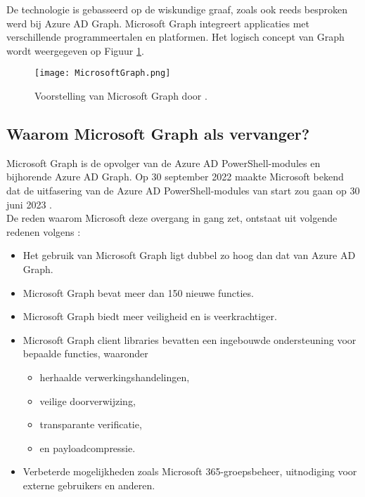 De technologie is gebasseerd op de wiskundige graaf, zoals ook reeds besproken werd bij Azure \Ac{AD} Graph. Microsoft Graph integreert applicaties met verschillende programmeertalen en platformen. Het logisch concept van Graph wordt weergegeven op Figuur \ref{msg}.

\begin{figure}[h]
    \texttt{[image: MicrosoftGraph.png]}
    \caption[Voorbeeld Microsoft Graph]{Voorstelling van Microsoft Graph door \textcite{Microsoft2023d}.}
    \label{msg}
\end{figure}

\subsection{Waarom Microsoft Graph als vervanger?} 
Microsoft Graph is de opvolger van de Azure \ac{AD} PowerShell-modules en bijhorende Azure \Ac{AD} Graph. Op 30 september 2022 maakte Microsoft bekend dat de uitfasering van de Azure \ac{AD} PowerShell-modules van start zou gaan op 30 juni 2023 \autocite{Sahay2022}. \\

De reden waarom Microsoft deze overgang in gang zet, ontstaat uit volgende redenen volgens \textcite{Microsoft2023e}:

\begin{itemize}
    \item Het gebruik van Microsoft Graph ligt dubbel zo hoog dan dat van Azure \ac{AD} Graph.
    \item Microsoft Graph bevat meer dan 150 nieuwe functies.
    \item Microsoft Graph biedt meer veiligheid en is veerkrachtiger.
    \item Microsoft Graph client libraries bevatten een ingebouwde ondersteuning voor bepaalde functies, waaronder
    \begin{itemize}
        \item herhaalde verwerkingshandelingen,
        \item veilige doorverwijzing,
        \item transparante verificatie,
        \item en payloadcompressie.
    \end{itemize}
    \item Verbeterde mogelijkheden zoals Microsoft 365-groepsbeheer, uitnodiging voor externe gebruikers en anderen.
\end{itemize} 

